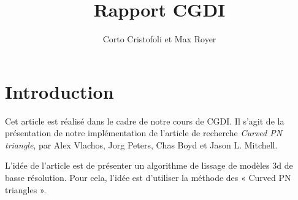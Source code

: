 \documentclass{article}
\title{Rapport CGDI}
\author{Corto Cristofoli et Max Royer}
\begin{document}
\maketitle
\tableofcontents



\section*{Introduction}
Cet article est réalisé dans le cadre de notre cours de CGDI.
Il s'agit de la présentation de notre implémentation de l'article
de recherche \textit{Curved PN triangle}, par Alex Vlachos, Jorg Peters,
Chas Boyd et Jason L. Mitchell.

L'idée de l'article est de présenter un algorithme de lissage de modèles 3d de
basse résolution. Pour cela, l'idée est d'utiliser la méthode des « Curved PN
triangles ».
\end{document}
